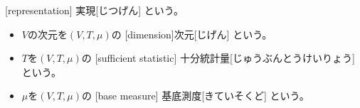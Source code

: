 \documentclass[report]{jlreq}
\begin{document}
\begin{definition}[指数型分布族]
\begin{itemize}
            [representation]
            {実現}[じつげん]
            という。
            \begin{itemize}
                \item $V$の次元を$(V, T, \mu)$の
                    [dimension]{次元}[じげん]
                    という。
                \item $T$を$(V, T, \mu)$の
                    [sufficient statistic]
                    {十分統計量}[じゅうぶんとうけいりょう]
                    という。
                \item $\mu$を$(V, T, \mu)$の
                    [base measure]
                    {基底測度}[きていそくど]
                    という。
            \end{itemize}
    \end{itemize}
\end{definition}
\end{document}

